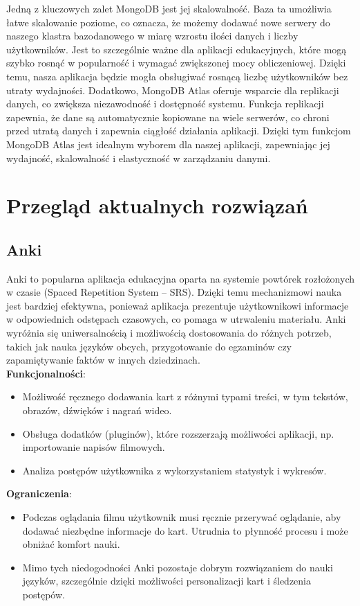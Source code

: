 Jedną z kluczowych zalet MongoDB jest jej skalowalność. Baza ta umożliwia łatwe skalowanie poziome, co oznacza, że możemy dodawać nowe serwery do naszego klastra bazodanowego w miarę wzrostu ilości danych i liczby użytkowników. Jest to szczególnie ważne dla aplikacji edukacyjnych, które mogą szybko rosnąć w popularność i wymagać zwiększonej mocy obliczeniowej. Dzięki temu, nasza aplikacja będzie mogła obsługiwać rosnącą liczbę użytkowników bez utraty wydajności. Dodatkowo, MongoDB Atlas oferuje wsparcie dla replikacji danych, co zwiększa niezawodność i dostępność systemu. Funkcja replikacji zapewnia, że dane są automatycznie kopiowane na wiele serwerów, co chroni przed utratą danych i zapewnia ciągłość działania aplikacji. Dzięki tym funkcjom MongoDB Atlas jest idealnym wyborem dla naszej aplikacji, zapewniając jej wydajność, skalowalność i elastyczność w zarządzaniu danymi.

\section{Przegląd aktualnych rozwiązań}

\subsection{Anki}
Anki to popularna aplikacja edukacyjna oparta na systemie powtórek rozłożonych w czasie (Spaced Repetition System – SRS). Dzięki temu mechanizmowi nauka jest bardziej efektywna, ponieważ aplikacja prezentuje użytkownikowi informacje w odpowiednich odstępach czasowych, co pomaga w utrwaleniu materiału. Anki wyróżnia się uniwersalnością i możliwością dostosowania do różnych potrzeb, takich jak nauka języków obcych, przygotowanie do egzaminów czy zapamiętywanie faktów w innych dziedzinach.\\
\textbf{Funkcjonalności}:
\begin{itemize}
    \item Możliwość ręcznego dodawania kart z różnymi typami treści, w tym tekstów, obrazów, dźwięków i nagrań wideo.
    \item Obsługa dodatków (pluginów), które rozszerzają możliwości aplikacji, np. importowanie napisów filmowych.
    \item Analiza postępów użytkownika z wykorzystaniem statystyk i wykresów.
\end{itemize}
\textbf{Ograniczenia}:
\begin{itemize}
    \item Podczas oglądania filmu użytkownik musi ręcznie przerywać oglądanie, aby dodawać niezbędne informacje do kart. Utrudnia to płynność procesu i może obniżać komfort nauki.
    \item Mimo tych niedogodności Anki pozostaje dobrym rozwiązaniem do nauki języków, szczególnie dzięki możliwości personalizacji kart i śledzenia postępów.
\end{itemize}

